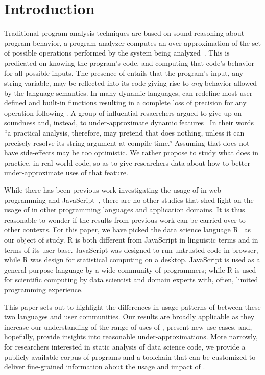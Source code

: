 \documentclass[conference]{IEEEtran}
\begin{document}
\section{Introduction}

Traditional program analysis techniques are based on sound reasoning about
program behavior, a program analyzer computes an over-approximation of the
set of possible operations performed by the system being
analyzed~\cite{cc77}.  This is predicated on knowing the program's code, and
computing that code's behavior for all possible inputs. The presence of
\eval entails that the program's input, any string variable, may be
reflected into its code giving rise to \emph{any} behavior allowed by the
language semantics. In many dynamic languages, \eval can redefine most
user-defined and built-in functions resulting in a complete loss of
precision for any operation following \eval. A group of influential
resaerchers argued to give up on soundness and, instead, to
under-approximate dynamic features~\cite{soundy} In their words ``a
practical analysis, therefore, may pretend that \eval does nothing, unless
it can precisely resolve its string argument at compile time.''  Assuming
that \eval does not have side-effects may be too optimistic. We rather
propose to study what \eval does in practice, in real-world code, so as to
give researchers data about how to better under-approximate uses of that
feature.

While there has been previous work investigating the usage of \eval in web
programming and JavaScript~\cite{ecoop11}, there are no other studies that
shed light on the usage of \eval in other programming languages and
application domains.  It is thus reasonable to wonder if the results from
previous work can be carried over to other contexts. For this paper, we have
picked the data science language R~\cite{r} as our object of study. R is
both different from JavaScript in linguistic terms and in terms of its user
base. JavaScript was designed to run untrusted code in browser, while R was
design for statistical computing on a desktop. JavaScript is used as a
general purpose language by a wide community of programmers; while R is used
for scientific computing by data scientist and domain experts with, often,
limited programming experience.

This paper sets out to highlight the differences in usage patterns of \eval
between these two languages and user communities. Our results are broadly
applicable as they increase our understanding of the range of uses of \eval,
present new use-cases, and, hopefully, provide insights into reasonable
under-approximations. More narrowly, for researchers interested in static
analysis of data science code, we provide a publicly available corpus of
programs and a toolchain that can be customized to deliver fine-grained
information about the usage and impact of \eval.
\end{document}
